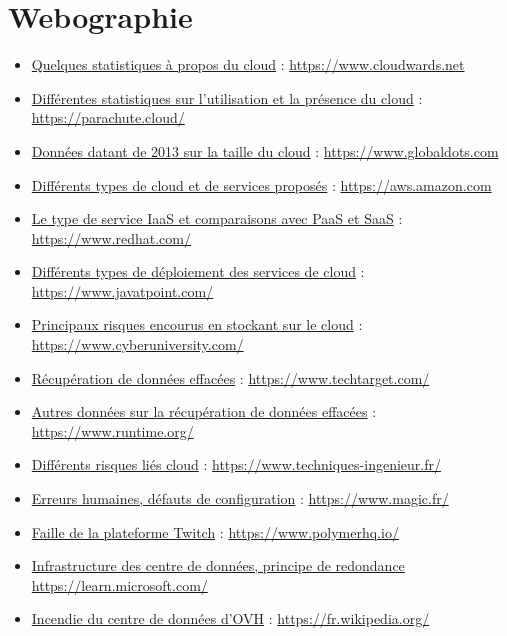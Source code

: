 \documentclass[a4paper, 12pt]{article}
\begin{document}
  \section{Webographie}
    \begin{itemize}
      \item \href{https://www.cloudwards.net/cloud-computing-statistics/}{Quelques statistiques à propos du cloud} : \url{https://www.cloudwards.net}
      \item \href{https://parachute.cloud/cloud-computing-statistics/}{Différentes statistiques sur l'utilisation et la présence du cloud} : \url{https://parachute.cloud/}
      \item \href{https://www.globaldots.com/resources/blog/how-much-is-stored-in-the-cloud/}{Données datant de 2013 sur la taille du cloud} : \url{https://www.globaldots.com}
      \item \href{https://aws.amazon.com/fr/types-of-cloud-computing/}{Différents types de cloud et de services proposés} : \url{https://aws.amazon.com}
      \item \href{https://www.redhat.com/fr/topics/cloud-computing/what-is-iaas}{Le type de service IaaS et comparaisons avec PaaS et SaaS} : \url{https://www.redhat.com/}
      \item \href{https://www.javatpoint.com/cloud-deployment-model}{Différents types de déploiement des services de cloud} : \url{https://www.javatpoint.com/}
      \item \href{https://www.cyberuniversity.com/post/la-securite-dans-le-cloud-principaux-risques-et-challenges}{Principaux risques encourus en stockant sur le cloud} : \url{https://www.cyberuniversity.com/}
      \item \href{https://www.techtarget.com/searchdisasterrecovery/definition/data-recovery}{Récupération de données effacées} : \url{https://www.techtarget.com/}
      \item \href{https://www.runtime.org/recoverability.htm}{Autres données sur la récupération de données effacées} : \url{https://www.runtime.org/}
      \item \href{https://www.techniques-ingenieur.fr/actualite/articles/la-securite-dans-le-cloud-une-approche-fournisseur-basee-sur-les-risques-15550/}{Différents risques liés cloud} : \url{https://www.techniques-ingenieur.fr/}
      \item \href{https://www.magic.fr/cloud-public-les-erreurs-de-configuration-sont-extremement-frequentes/}{Erreurs humaines, défauts de configuration} : \url{https://www.magic.fr/}
      \item \href{https://www.polymerhq.io/blog/breach/how-did-the-twitch-data-leak-happen/}{Faille de la plateforme Twitch} : \url{https://www.polymerhq.io/}
      \item \href{https://learn.microsoft.com/fr-fr/compliance/assurance/assurance-datacenter-architecture-infrastructure}{Infrastructure des centre de données, principe  de redondance}  \url{https://learn.microsoft.com/}
      \item \href{https://fr.wikipedia.org/wiki/Incendie_du_centre_de_donn%C3%A9es_d%27OVHcloud_%C3%A0_Strasbourg}{Incendie du centre de données d'OVH} : \url{https://fr.wikipedia.org/}


\end{itemize}
\end{document}
